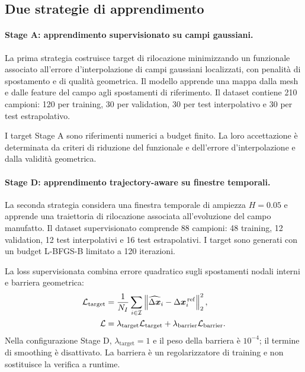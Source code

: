\subsection{Due strategie di apprendimento}

\paragraph{Stage A: apprendimento supervisionato su campi gaussiani.}
La prima strategia costruisce target di rilocazione minimizzando un funzionale associato all'errore d'interpolazione di campi gaussiani localizzati, con penalità di spostamento e di qualità geometrica. Il modello apprende una mappa dalla mesh e dalle feature del campo agli spostamenti di riferimento. Il dataset contiene 210 campioni: 120 per training, 30 per validation, 30 per test interpolativo e 30 per test estrapolativo.

I target Stage A sono riferimenti numerici a budget finito. La loro accettazione è determinata da criteri di riduzione del funzionale e dell'errore d'interpolazione e dalla validità geometrica.

\paragraph{Stage D: apprendimento trajectory-aware su finestre temporali.}
La seconda strategia considera una finestra temporale di ampiezza $H=0.05$ e apprende una traiettoria di rilocazione associata all'evoluzione del campo manufatto. Il dataset supervisionato comprende 88 campioni: 48 training, 12 validation, 12 test interpolativi e 16 test estrapolativi. I target sono generati con un budget L-BFGS-B limitato a 120 iterazioni.

La loss supervisionata combina errore quadratico sugli spostamenti nodali interni e barriera geometrica:
\begin{align}
\mathcal L_{\mathrm{target}}
&=\frac{1}{N_I}\sum_{i\in\mathcal I}
\left\lVert \widehat{\Delta\bm x}_i-\Delta\bm x_i^{\,\mathrm{ref}} \right\rVert_2^2,\\
\mathcal L
&=\lambda_{\mathrm{target}}\mathcal L_{\mathrm{target}}
+\lambda_{\mathrm{barrier}}\mathcal L_{\mathrm{barrier}}.
\label{eq:training_loss}
\end{align}
Nella configurazione Stage D, $\lambda_{\mathrm{target}}=1$ e il peso della barriera è $10^{-4}$; il termine di smoothing è disattivato. La barriera è un regolarizzatore di training e non sostituisce la verifica a runtime.

